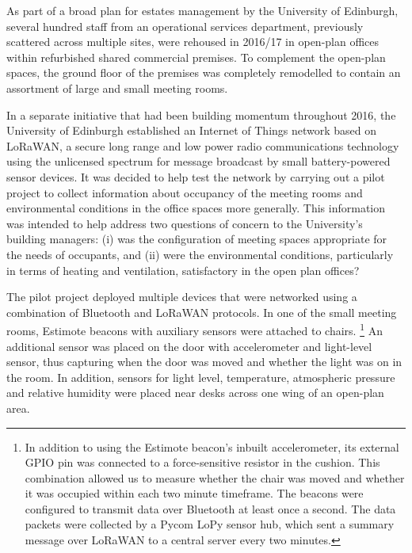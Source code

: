 As part of a broad plan for estates management by the University of
Edinburgh, several hundred staff from an operational
services department, previously scattered across multiple sites, were
rehoused in 2016/17 in open-plan offices within refurbished shared
commercial premises. To complement the open-plan spaces, the ground
floor of the premises was completely remodelled to contain an
assortment of large and small meeting rooms. 

In a separate initiative that had been building momentum throughout
2016, the University of Edinburgh established an Internet of Things
network based on LoRaWAN, a secure long range and low power radio
communications technology using the unlicensed spectrum for message
broadcast by small battery-powered sensor devices. It was decided to
help test the network by carrying out a pilot project to collect
information about occupancy of the meeting rooms and environmental
conditions in the office spaces more generally. This information was
intended to help address two questions of concern to the University’s
building managers: (i) was the configuration of meeting spaces
appropriate for the needs of occupants, and (ii) were the
environmental conditions, particularly in terms of heating and
ventilation, satisfactory in the open plan offices? 

The pilot project deployed multiple devices that were networked using
a combination of Bluetooth and LoRaWAN protocols. In one of the small
meeting rooms, Estimote beacons with auxiliary sensors were attached
to chairs.%
\footnote{
 In addition to using the Estimote beacon's inbuilt accelerometer, its
 external GPIO pin was connected to a force-sensitive resistor in the
 cushion. This combination allowed us to measure whether the chair was moved and
 whether it was occupied within each two minute timeframe. The
 beacons were configured to transmit data over Bluetooth at least once a
 second. The data packets were collected by
 a Pycom LoPy sensor hub,  which sent a summary message over LoRaWAN to a
 central server every two minutes. } 
An additional sensor was placed
on the door with accelerometer and light-level sensor, thus capturing
when the door was moved and whether the light was on in the room. In
addition, sensors for light level, temperature, atmospheric pressure
and relative humidity were placed near desks across one wing of an
open-plan area.

